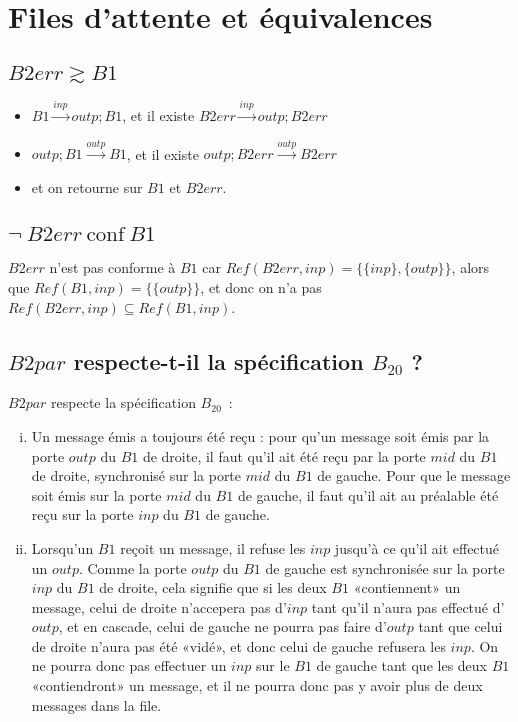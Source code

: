 \documentclass[a4paper,french,9pt]{article}
\def\transition#1{\stackrel{#1}{\longrightarrow}}
\def\conf{\ \text{conf}\ }
\let\simule\gtrsim
\begin{document}
\section{Files d'attente et équivalences}
\subsection{$B2err\simule B1$}

\begin{itemize}
\item $B1\transition{inp} outp;B1$, et il existe $B2err\transition{inp}outp;B2err$
\item $outp;B1\transition{outp}B1$, et il existe $outp;B2err\transition{outp}B2err$
\item et on retourne sur $B1$ et $B2err$.
\end{itemize}

\subsection{$\neg\ B2err\conf B1$}
$B2err$ n'est pas conforme à $B1$ car $Ref(B2err, inp) = \{\{inp\}, \{outp\}\}$, alors que $Ref(B1,inp) = \{\{outp\}\}$,
et donc on n'a pas $Ref(B2err, inp) \subseteq Ref(B1, inp)$.

\subsection{$B2par$ respecte-t-il la spécification $B_20$ ?}
$B2par$ respecte la spécification $B_20$~:
\begin{enumerate}[i)]
\item Un message émis a toujours été reçu : pour qu'un message soit
  émis par la porte $outp$ du $B1$ de droite, il faut qu'il ait été
  reçu par la porte $mid$ du $B1$ de droite, synchronisé sur la porte
  $mid$ du $B1$ de gauche. Pour que le message soit émis sur la porte
  $mid$ du $B1$ de gauche, il faut qu'il ait au préalable été reçu sur
  la porte $inp$ du $B1$ de gauche.
\item Lorsqu'un $B1$ reçoit un message, il refuse les $inp$ jusqu'à ce
  qu'il ait effectué un $outp$. Comme la porte $outp$ du $B1$ de
  gauche est synchronisée sur la porte $inp$ du $B1$ de droite, cela
  signifie que si les deux $B1$ «contiennent» un message, celui de
  droite n'accepera pas d'$inp$ tant qu'il n'aura pas effectué
  d'$outp$, et en cascade, celui de gauche ne pourra pas faire
  d'$outp$ tant que celui de droite n'aura pas été «vidé», et donc
  celui de gauche refusera les $inp$. On ne pourra donc pas effectuer
  un $inp$ sur le $B1$ de gauche tant que les deux $B1$ «contiendront»
  un message, et il ne pourra donc pas y avoir plus de deux messages
  dans la file.
\end{enumerate}
\end{document}
